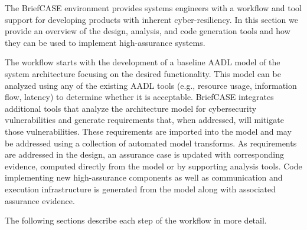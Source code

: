 

The BriefCASE environment provides systems engineers with a workflow and tool support for developing
products with inherent cyber-resiliency. 
In this section we provide an overview of the design, analysis, and code generation tools and how they can be used
to implement high-assurance systems.  

The  workflow starts with the development of a baseline AADL model of the system architecture
focusing on the desired functionality. This model can be analyzed using any of the existing AADL 
tools (e.g., resource usage, information flow, latency) to determine whether it is acceptable.
BriefCASE integrates additional tools that analyze the architecture model for cybersecurity vulnerabilities and
generate requirements that, when addressed, will mitigate those vulnerabilities.
These requirements are imported into the model and may be addressed using a 
collection of automated model transforms. As requirements are addressed in the design, an assurance case is updated with
corresponding evidence, computed directly from the model or by supporting analysis tools.  
Code implementing new high-assurance components as well as communication and execution infrastructure
is generated from the model along with associated assurance evidence.  

The following sections describe each step of the workflow in more detail. 

